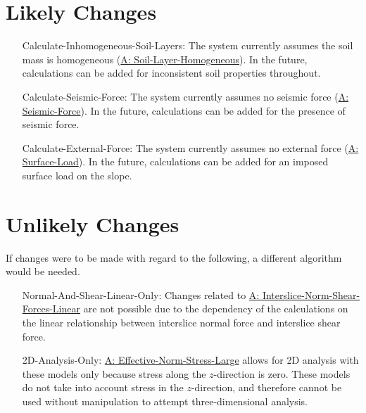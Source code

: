 \documentclass[12pt]{article}
\begin{document}
\section{Likely Changes}
\label{Sec:LCs}
\begin{itemize}
\item[Calculate-Inhomogeneous-Soil-Layers:\phantomsection\label{LC_inhomogeneous}]The system currently assumes the soil mass is homogeneous (\hyperref[assumpSLH]{A: Soil-Layer-Homogeneous}). In the future, calculations can be added for inconsistent soil properties throughout.
\item[Calculate-Seismic-Force:\phantomsection\label{LC_seismic}]The system currently assumes no seismic force (\hyperref[assumpSF]{A: Seismic-Force}). In the future, calculations can be added for the presence of seismic force.
\item[Calculate-External-Force:\phantomsection\label{LC_external}]The system currently assumes no external force (\hyperref[assumpSL]{A: Surface-Load}). In the future, calculations can be added for an imposed surface load on the slope.
\end{itemize}
\section{Unlikely Changes}
\label{Sec:UCs}
If changes were to be made with regard to the following, a different algorithm would be needed.
\begin{itemize}
\item[Normal-And-Shear-Linear-Only:\phantomsection\label{UC_normshearlinear}]Changes related to \hyperref[assumpINSFL]{A: Interslice-Norm-Shear-Forces-Linear} are not possible due to the dependency of the calculations on the linear relationship between interslice normal force and interslice shear force.
\item[2D-Analysis-Only:\phantomsection\label{UC_2donly}]\hyperref[assumpENSL]{A: Effective-Norm-Stress-Large} allows for 2D analysis with these models only because stress along the $z$-direction is zero. These models do not take into account stress in the $z$-direction, and therefore cannot be used without manipulation to attempt three-dimensional analysis.
\end{itemize}
\end{document}
